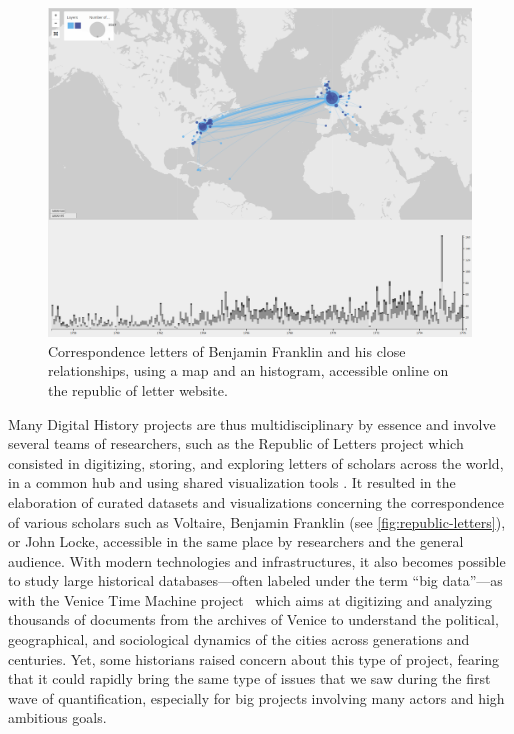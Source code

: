 \begin{figure}
    \centering %
    \includegraphics[width=1\textwidth]{static/figures/RelatedWork/RepublicOfLetter_BenjFranklin}
    \caption{Correspondence letters of Benjamin Franklin and his close relationships, using a map and an histogram, accessible online on the republic of letter website\cite{edelsteinHistoricalResearchDigital2017}.}
    \label{fig:republic-letters}
\end{figure}

Many Digital History projects are thus multidisciplinary by essence and involve several teams of researchers, such as the Republic of Letters project which consisted in digitizing, storing, and exploring letters of scholars across the world, in a common hub and using shared visualization tools \cite{edelsteinHistoricalResearchDigital2017}.
It resulted in the elaboration of curated datasets and visualizations concerning the correspondence of various scholars such as Voltaire, Benjamin Franklin (see \autoref{fig:republic-letters}), or John Locke, accessible in the same place by researchers and the general audience.
With modern technologies and infrastructures, it also becomes possible to study large historical databases---often labeled under the term ``big data''---as with the Venice Time Machine project~\cite{kaplanVeniceTimeMachine2015} which aims at digitizing and analyzing thousands of documents from the archives of Venice to understand the political, geographical, and sociological dynamics of the cities across generations and centuries.
Yet, some historians raised concern about this type of project, fearing that it could rapidly bring the same type of issues that we saw during the first wave of quantification, especially for big projects involving many actors and high ambitious goals\cite{lemercierQuantitativeMethodsHumanities2019}.

